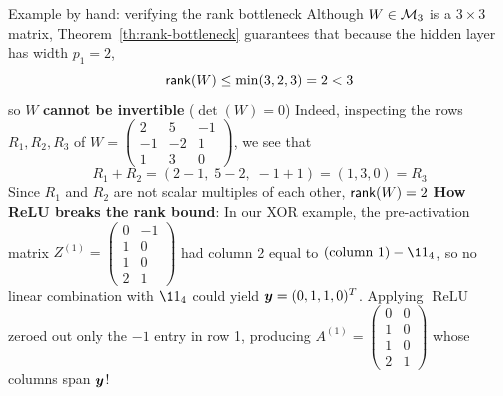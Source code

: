 \documentclass[aspectratio=169]{beamer}\usepackage[]{graphicx}\usepackage[]{xcolor}
\begin{document}
\begin{frame}{Example by hand: verifying the rank bottleneck}
Although $W \in \mathcal{M}_3$ is a $3 \times 3$ matrix, Theorem~\ref{th:rank-bottleneck} guarantees that because the hidden layer has width $p_1 = 2$,
\[
\mathsf{rank}(W) \le \min(3, 2, 3) = 2 < 3
\]
so $W$ \textbf{cannot be invertible} ($\det(W) = 0$)
\vfill
Indeed, inspecting the rows $R_1, R_2, R_3$ of $W = \begin{pmatrix} 2 & 5 & -1 \\ -1 & -2 & 1 \\ 1 & 3 & 0 \end{pmatrix}$, we see that
\[
R_1 + R_2 = (2 - 1, \; 5 - 2, \; -1 + 1) = (1, 3, 0) = R_3
\]
Since $R_1$ and $R_2$ are not scalar multiples of each other, $\mathsf{rank}(W) = 2$
\vfill
\textbf{How ReLU breaks the rank bound}: In our XOR example, the pre-activation matrix $Z^{(1)} = \begin{pmatrix} 0 & -1 \\ 1 & 0 \\ 1 & 0 \\ 2 & 1 \end{pmatrix}$ had column 2 equal to $(\text{column } 1) - \11_4$, so no linear combination with $\11_4$ could yield $\bm{y} = (0, 1, 1, 0)^T$. Applying $\operatorname{ReLU}$ zeroed out only the $-1$ entry in row 1, producing $A^{(1)} = \begin{pmatrix} 0 & 0 \\ 1 & 0 \\ 1 & 0 \\ 2 & 1 \end{pmatrix}$ whose columns span $\bm{y}$!
\end{frame}


\end{document}
